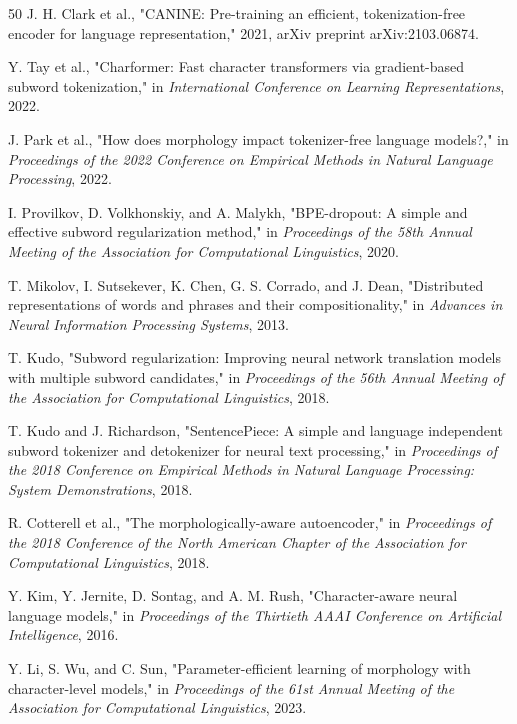 \documentclass[conference]{IEEEtran}
\begin{document}
\begin{thebibliography}{50}
J. H. Clark et al., "CANINE: Pre-training an efficient, tokenization-free encoder for language representation," 2021, arXiv preprint arXiv:2103.06874.

Y. Tay et al., "Charformer: Fast character transformers via gradient-based subword tokenization," in \textit{International Conference on Learning Representations}, 2022.

J. Park et al., "How does morphology impact tokenizer-free language models?," in \textit{Proceedings of the 2022 Conference on Empirical Methods in Natural Language Processing}, 2022.

I. Provilkov, D. Volkhonskiy, and A. Malykh, "BPE-dropout: A simple and effective subword regularization method," in \textit{Proceedings of the 58th Annual Meeting of the Association for Computational Linguistics}, 2020.

T. Mikolov, I. Sutsekever, K. Chen, G. S. Corrado, and J. Dean, "Distributed representations of words and phrases and their compositionality," in \textit{Advances in Neural Information Processing Systems}, 2013.

T. Kudo, "Subword regularization: Improving neural network translation models with multiple subword candidates," in \textit{Proceedings of the 56th Annual Meeting of the Association for Computational Linguistics}, 2018.

T. Kudo and J. Richardson, "SentencePiece: A simple and language independent subword tokenizer and detokenizer for neural text processing," in \textit{Proceedings of the 2018 Conference on Empirical Methods in Natural Language Processing: System Demonstrations}, 2018.

R. Cotterell et al., "The morphologically-aware autoencoder," in \textit{Proceedings of the 2018 Conference of the North American Chapter of the Association for Computational Linguistics}, 2018.

Y. Kim, Y. Jernite, D. Sontag, and A. M. Rush, "Character-aware neural language models," in \textit{Proceedings of the Thirtieth AAAI Conference on Artificial Intelligence}, 2016.

Y. Li, S. Wu, and C. Sun, "Parameter-efficient learning of morphology with character-level models," in \textit{Proceedings of the 61st Annual Meeting of the Association for Computational Linguistics}, 2023.


\end{thebibliography}
\end{document}
